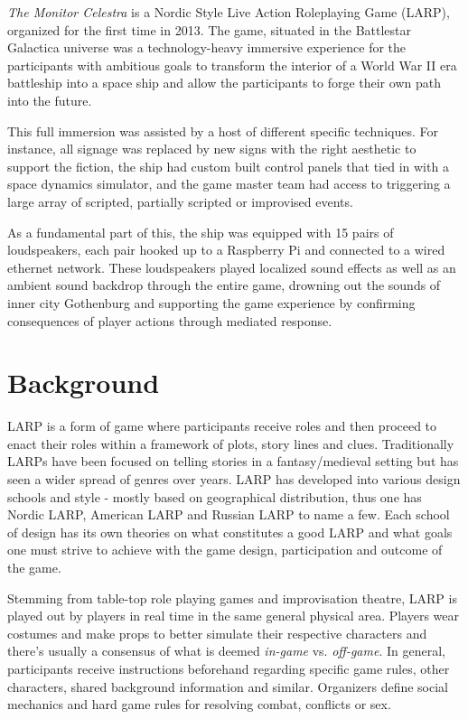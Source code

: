 \emph{The Monitor Celestra} is a Nordic Style Live Action Roleplaying Game (LARP), organized for the first time in 2013. 
The game, situated
in the Battlestar Galactica\cite{larson_battlestar_1978} universe was a technology-heavy
immersive experience for the participants with ambitious goals to
transform the interior of a World War II era battleship into a
space ship and allow the participants to forge their own path into the future.

This full immersion was assisted by a host of different specific
techniques. For instance, all signage was replaced by new signs with the right
aesthetic to support the fiction, the ship had custom built control
panels that tied in with a space dynamics simulator, and the game
master team had access to triggering a large array of scripted, partially scripted or improvised events.

As a fundamental part of this, the ship was equipped with 15 pairs of
loudspeakers, each pair hooked up to a Raspberry Pi\cite{rpi} and
connected to a wired ethernet network. These loudspeakers played
localized sound effects as well as an ambient sound backdrop through
the entire game, drowning out the sounds of inner city Gothenburg and
supporting the game experience by confirming consequences of player
actions through mediated response.

\section{Background}
\label{sec:background}

LARP is a form of game where participants receive roles and then proceed to enact their roles within a framework of plots, story lines and clues. Traditionally LARPs have been focused on telling stories in a fantasy/medieval setting but has seen a wider spread of genres over years. LARP has developed into various design schools and style - mostly based on geographical distribution, thus one has Nordic LARP, American LARP and Russian LARP to name a few\cite{kp2011}. Each school of design has its own theories on what constitutes a good LARP and what goals one must strive to achieve with the game design, participation and outcome of the game. 

Stemming from table-top role playing games and improvisation theatre, LARP is played out by players in real time in the same general physical area. Players wear costumes and make props to better simulate their respective characters and there's usually a consensus of what is deemed \emph{in-game} vs. \emph{off-game}. In general, participants receive instructions beforehand regarding specific game rules, other characters, shared background information and similar. Organizers define social mechanics and hard game rules for resolving combat, conflicts or sex. 

